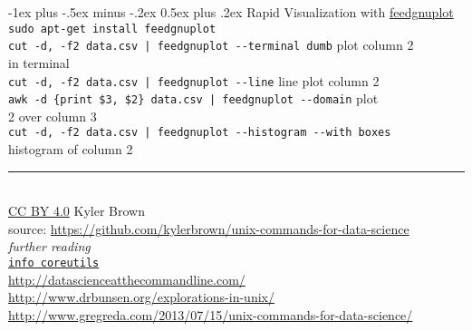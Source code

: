 \documentclass[10pt]{article}
\makeatletter
\renewcommand{\section}{\@startsection{section}{1}{0mm}%
                                {-1ex plus -.5ex minus -.2ex}%
                                {0.5ex plus .2ex}%
                                {\normalfont\large\bfseries}}
\newcommand{\q}{\textquotesingle } %
\makeatother
\begin{document}
\begin{multicols}{2}
\section{Rapid Visualization with \href{https://github.com/dkogan/feedgnuplot}{feedgnuplot}}
{\tt sudo apt-get install feedgnuplot}\\
{\tt cut -d, -f2  data.csv | feedgnuplot -{}-terminal \q dumb\q} \hfill plot column 2\\
	\hfill in terminal\\
{\tt  cut -d, -f2  data.csv | feedgnuplot -{}-line} \hfill line plot column 2\\
{\tt awk -d \q\{print \$3, \$2\}\q\  data.csv | feedgnuplot -{}-domain} \hfill plot \\
	\hfill 2 over column 3\\
{\tt cut -d, -f2   data.csv | feedgnuplot -{}-histogram -{}-with boxes}\\
	\hfill histogram of column 2\\

\rule{0.3\linewidth}{0.25pt}\\
\scriptsize
\href{https://creativecommons.org/licenses/by/4.0/}{CC BY 4.0} Kyler Brown\\
source: \url{https://github.com/kylerbrown/unix-commands-for-data-science}\\

\textit{further reading}\\
\href{https://www.gnu.org/software/coreutils/manual/coreutils.html}{{\tt info coreutils}}\\
\url{http://datascienceatthecommandline.com/}\\
\url{http://www.drbunsen.org/explorations-in-unix/}\\
\url{http://www.gregreda.com/2013/07/15/unix-commands-for-data-science/}\\


\end{multicols}
\end{document}
